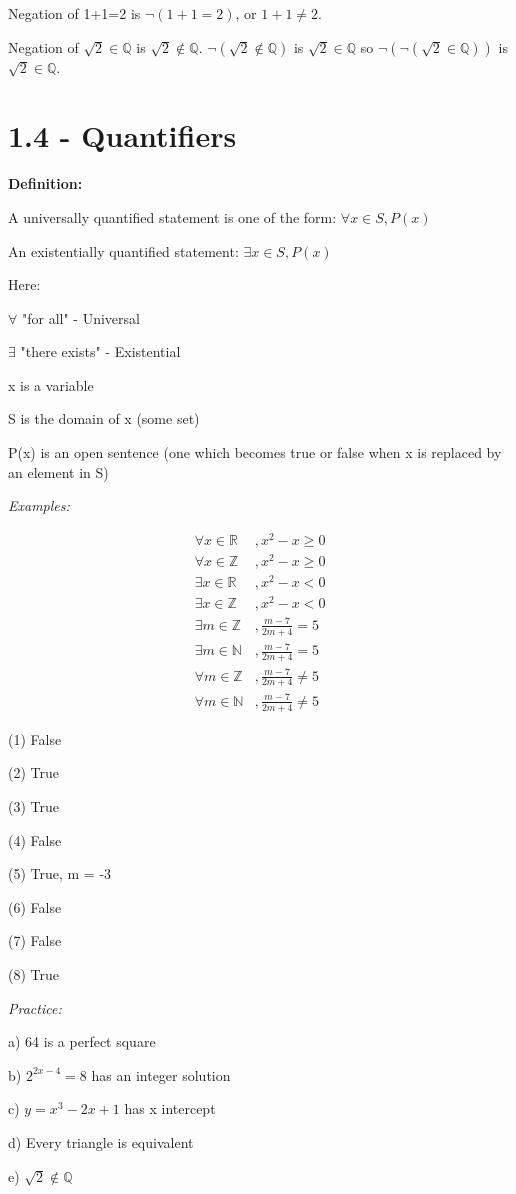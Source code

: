 \documentclass[11pt]{article}
\begin{document}
    Negation of 1+1=2 is $\neg(1+1=2)$, or $1+1\neq2$.

    Negation of $\sqrt{2} \in \mathbb{Q}$ is $\sqrt{2} \notin \mathbb{Q}$. $\neg(\sqrt{2} \notin \mathbb{Q})$ is $\sqrt{2} \in \mathbb{Q}$ so $\neg(\neg(\sqrt{2} \in \mathbb{Q}))$ is $\sqrt{2} \in \mathbb{Q}$.

\section*{1.4 - Quantifiers}
\textbf{Definition: }

A universally quantified statement is one of the form: $\forall x \in S, P(x)$

An existentially quantified statement:
$\exists x \in S, P(x)$
\medskip

Here:

$\forall$ "for all" - Universal

$\exists$ "there exists" - Existential

x is a variable

S is the domain of x (some set)

P(x) is an open sentence (one which becomes true or false when x is replaced by an element in S)

\medskip

\textit{Examples:}

\begin{align}
    \forall x \in \mathbb{R}&, x^2-x \geq 0\\
    \forall x \in \mathbb{Z}&, x^2-x \geq 0\\
    \exists x \in \mathbb{R}&, x^2-x < 0\\
    \exists x \in \mathbb{Z}&, x^2-x < 0\\
    \exists m \in \mathbb{Z}&, \frac{m-7}{2m+4} = 5\\
    \exists m \in \mathbb{N}&, \frac{m-7}{2m+4} = 5\\
    \forall m \in \mathbb{Z}&, \frac{m-7}{2m+4} \neq 5\\
    \forall m \in \mathbb{N}&, \frac{m-7}{2m+4} \neq 5
\end{align}

(1) False

(2) True

(3) True

(4) False

(5) True, m = -3

(6) False

(7) False

(8) True
\medskip

\textit{Practice:}

a) 64 is a perfect square

b) $2^{2x-4} = 8$ has an integer solution

c) $y = x^3 - 2x + 1$ has x intercept

d) Every triangle is equivalent

e) $\sqrt{2} \notin \mathbb{Q}$
\end{document}
